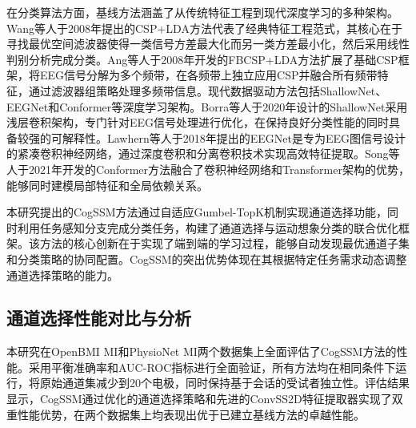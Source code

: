 在分类算法方面，基线方法涵盖了从传统特征工程到现代深度学习的多种架构。Wang等人于2008年提出的CSP+LDA方法\cite{wang2008local}代表了经典特征工程范式，其核心在于寻找最优空间滤波器使得一类信号方差最大化而另一类方差最小化，然后采用线性判别分析完成分类。Ang等人于2008年开发的FBCSP+LDA方法\cite{ang2008filter}扩展了基础CSP框架，将EEG信号分解为多个频带，在各频带上独立应用CSP并融合所有频带特征，通过滤波器组策略处理多频带信息。现代数据驱动方法包括ShallowNet、EEGNet和Conformer等深度学习架构。Borra等人于2020年设计的ShallowNet\cite{borra2020interpretable}采用浅层卷积架构，专门针对EEG信号处理进行优化，在保持良好分类性能的同时具备较强的可解释性。Lawhern等人于2018年提出的EEGNet\cite{lawhern2018eegnet}是专为EEG图信号设计的紧凑卷积神经网络，通过深度卷积和分离卷积技术实现高效特征提取。Song等人于2021年开发的Conformer方法\cite{song2022eeg}融合了卷积神经网络和Transformer架构的优势，能够同时建模局部特征和全局依赖关系。

本研究提出的CogSSM方法通过自适应Gumbel-TopK机制实现通道选择功能，同时利用任务感知分支完成分类任务，构建了通道选择与运动想象分类的联合优化框架。该方法的核心创新在于实现了端到端的学习过程，能够自动发现最优通道子集和分类策略的协同配置。CogSSM的突出优势体现在其根据特定任务需求动态调整通道选择策略的能力。

\subsection{通道选择性能对比与分析}
\label{subsec:comparison_sota}
本研究在OpenBMI MI和PhysioNet MI两个数据集上全面评估了CogSSM方法的性能。采用平衡准确率和AUC-ROC指标进行全面验证，所有方法均在相同条件下运行，将原始通道集减少到20个电极，同时保持基于会话的受试者独立性。评估结果显示，CogSSM通过优化的通道选择策略和先进的ConvSS2D特征提取器实现了双重性能优势，在两个数据集上均表现出优于已建立基线方法的卓越性能。

